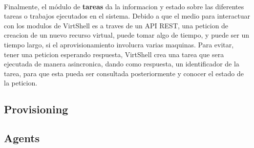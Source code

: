 \\
Finalmente, el módulo de \textbf{tareas} da la informacion y estado sobre las diferentes tareas o trabajos ejecutados en el sistema. Debido a que el medio para interactuar con los modulos de VirtShell es a traves de un API REST, una peticion de creacion de un nuevo recurso virtual, puede tomar algo de tiempo, y puede ser un tiempo largo, si el aprovisionamiento involucra varias maquinas. Para evitar, tener una peticion esperando respuesta, VirtShell crea una tarea que sera ejecutada de manera asincronica, dando como respuesta, un identificador de la tarea, para que esta pueda ser consultada posteriormente y conocer el estado de la peticion.


\subsection{Provisioning}

\subsection{Agents}

